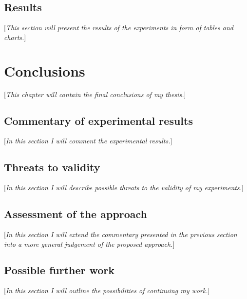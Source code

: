 \documentclass{pracamgr}
\begin{document}
\section{Results}
\label{sec:results}
[\textit{This section will present the results of the experiments in form of tables and charts.}]

\chapter{Conclusions}
\label{cha:conclusions}
[\textit{This chapter will contain the final conclusions of my thesis.}]

\section{Commentary of experimental results}
\label{sec:commentary}
[\textit{In this section I will comment the experimental results.}]

\section{Threats to validity}
\label{sec:threats}
[\textit{In this section I will describe possible threats to the validity of my experiments.}]

\section{Assessment of the approach}
\label{sec:assessment}
[\textit{In this section I will extend the commentary presented in the previous section into a more general judgement of the proposed approach.}]

\section{Possible further work}
\label{sec:further_work}
[\textit{In this section I will outline the possibilities of continuing my work.}]

\printbibliography[heading=bibintoc]
\end{document}
